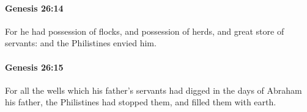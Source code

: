 		\paragraph{Genesis 26:14} %
			\label{GENESIS-26-14}

			For he had possession of flocks, and possession of herds, and great store of servants: and the Philistines envied him.


		\paragraph{Genesis 26:15} %
			\label{GENESIS-26-15}

			For all the wells which his father's servants had digged in the days of Abraham his father, the Philistines had stopped them, and filled them with earth.


